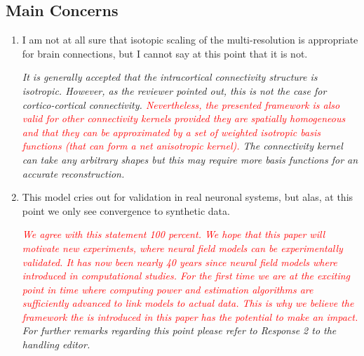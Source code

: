 \documentclass{article}
\newcommand{\dean}[1]{\textcolor{red}{#1}}
\newcommand{\parham}[1]{\textcolor{blue}{#1}}
\begin{document}
    \subsection{Main Concerns}
		\begin{enumerate} 
			\item I am not at all sure that isotopic scaling of the multi-resolution is appropriate for brain connections, but I cannot say at this point that it is not.
			
			\emph{It is generally accepted that the intracortical connectivity structure is isotropic. However, as the reviewer pointed out, this is not the case for cortico-cortical connectivity. \dean{Nevertheless, the presented framework is also valid for other connectivity kernels provided they are spatially homogeneous and that they can be approximated by a set of weighted isotropic basis functions (that can form a net anisotropic kernel).} The connectivity kernel can take any arbitrary shapes but this may require more basis functions for an accurate reconstruction.}
			 
			\item This model cries out for validation in real neuronal systems, but alas, at this point we only see convergence to synthetic data.   
			  
			 \emph{\dean{We agree with this statement 100 percent. We hope that this paper will motivate new experiments, where neural field models can be experimentally validated. It has now been nearly 40 years since neural field models where introduced in computational studies. For the first time we are at the exciting point in time where computing power and estimation algorithms are sufficiently advanced to link models to actual data. This is why we believe the framework the is introduced in this paper has the potential to make an impact.} For further remarks regarding this point please refer to Response 2 to the handling editor.}
			

\end{enumerate}
\end{document}
